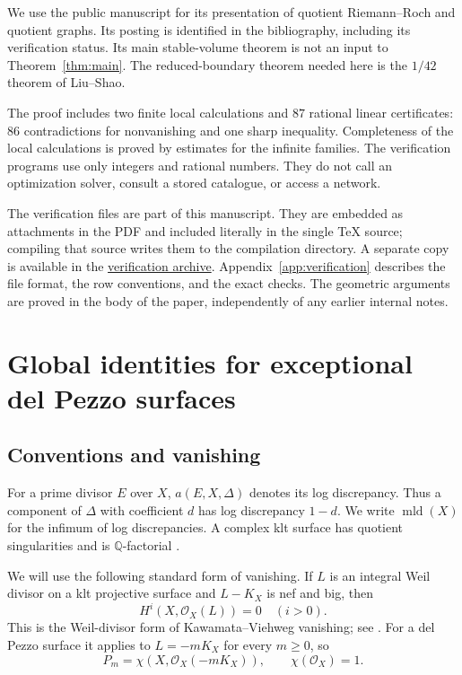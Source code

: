 \documentclass[12pt,a4paper]{article}
\numberwithin{equation}{section}
\theoremstyle{definition}
\newcommand{\Q}{\mathbb Q}
\newcommand{\OO}{\mathcal O}
\newcommand{\mld}{\operatorname{mld}}
\newcommand{\efvurl}{https://pxb42.github.io/drafts/Exceptional_Fano_Volume_Verification.zip}
\begin{document}
We use the public manuscript \cite{LL26stable} for its presentation of
quotient Riemann--Roch and quotient graphs. Its posting is identified
in the bibliography, including its verification status.
Its main stable-volume theorem is not an input to
Theorem~\ref{thm:main}. The reduced-boundary theorem needed here is
the \(1/42\) theorem of Liu--Shao.

The proof includes two finite local calculations and \(87\) rational
linear certificates: \(86\) contradictions for nonvanishing and one
sharp inequality. Completeness of the local calculations is proved
by estimates for the infinite families. The verification programs use
only integers and rational numbers. They do not call an optimization
solver, consult a stored catalogue, or access a network.

The verification files are part of this manuscript. They are
embedded as attachments in the PDF and included literally in the
single TeX source; compiling that source writes them to the
compilation directory. A separate copy is available in the
\href{\efvurl}{verification archive}. Appendix~\ref{app:verification}
describes the file format, the row conventions, and the exact checks.
The geometric arguments are proved in the body of the paper,
independently of any earlier internal notes.

\section{Global identities for exceptional del Pezzo surfaces}
\label{sec:global}

\subsection{Conventions and vanishing}

For a prime divisor \(E\) over \(X\), \(a(E,X,\Delta)\) denotes its
log discrepancy. Thus a component of \(\Delta\) with coefficient
\(d\) has log discrepancy \(1-d\).
We write \(\mld(X)\) for the infimum of log discrepancies.
A complex klt surface has quotient singularities and is
\(\Q\)-factorial \cite[Chapter 4]{KM98}.

We will use the following standard form of vanishing.
If \(L\) is an integral Weil divisor on a klt projective surface and
\(L-K_X\) is nef and big, then
\begin{equation}\label{eq:weil-kv}
                         H^i(X,\OO_X(L))=0\quad(i>0).
\end{equation}
This is the Weil-divisor form of Kawamata--Viehweg vanishing;
see \cite[Corollary 2.49]{Fuj09}.
For a del Pezzo surface it applies to \(L=-mK_X\) for every
\(m\geq0\), so
\begin{equation}\label{eq:chi-P}
                    P_m=\chi(X,\OO_X(-mK_X)),\qquad\chi(\OO_X)=1.
\end{equation}
\end{document}
